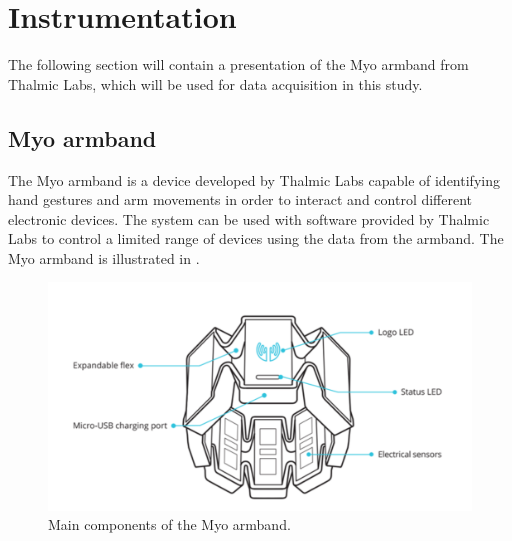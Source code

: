 \section{Instrumentation} \label{sec:myoband}

The following section will contain a presentation of the Myo armband from Thalmic Labs, which will be used for data acquisition in this study.

\subsection{Myo armband}

The Myo armband is a device developed by Thalmic Labs capable of identifying hand gestures and arm movements in order to interact and control different electronic devices. The system can be used with software provided by Thalmic Labs to control a limited range of devices using the data from the armband.
The Myo armband is illustrated in . 

\begin{figure}[H]                    
	\includegraphics[width=.5\textwidth]{figures/myob/armband}  %
	\caption{Main components of the Myo armband. \cite{thalmic}}
	\label{fig:armband}  %
\end{figure}




